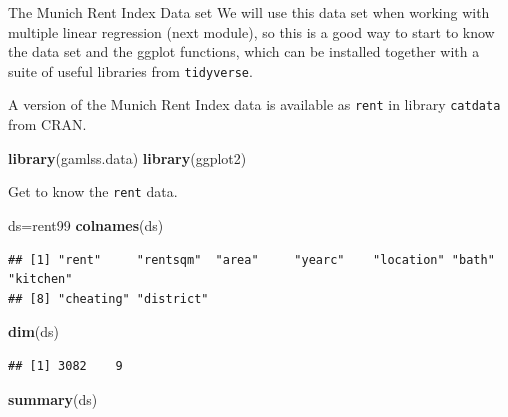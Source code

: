 \documentclass[
  ignorenonframetext,
]{beamer}
\newenvironment{Shaded}{\begin{snugshade}}{\end{snugshade}}
\newcommand{\FunctionTok}[1]{\textcolor[rgb]{0.13,0.29,0.53}{\textbf{#1}}}
\newcommand{\NormalTok}[1]{#1}
\newcommand{\OtherTok}[1]{\textcolor[rgb]{0.56,0.35,0.01}{#1}}
\begin{document}
\begin{frame}[fragile]
\begin{block}{The Munich Rent Index Data set}
\label{the-munich-rent-index-data-set}
We will use this data set when working with multiple linear regression
(next module), so this is a good way to start to know the data set and
the ggplot functions, which can be installed together with a suite of
useful libraries from \texttt{tidyverse}.

A version of the Munich Rent Index data is available as \texttt{rent} in
library \texttt{catdata} from CRAN.

\begin{Shaded}
\begin{Highlighting}[]
\FunctionTok{library}\NormalTok{(gamlss.data)}
\FunctionTok{library}\NormalTok{(ggplot2)}
\end{Highlighting}
\end{Shaded}

Get to know the \texttt{rent} data.

\begin{Shaded}
\begin{Highlighting}[]
\NormalTok{ds}\OtherTok{=}\NormalTok{rent99}
\FunctionTok{colnames}\NormalTok{(ds)}
\end{Highlighting}
\end{Shaded}

\begin{verbatim}
## [1] "rent"     "rentsqm"  "area"     "yearc"    "location" "bath"     "kitchen" 
## [8] "cheating" "district"
\end{verbatim}

\begin{Shaded}
\begin{Highlighting}[]
\FunctionTok{dim}\NormalTok{(ds)}
\end{Highlighting}
\end{Shaded}

\begin{verbatim}
## [1] 3082    9
\end{verbatim}

\begin{Shaded}
\begin{Highlighting}[]
\FunctionTok{summary}\NormalTok{(ds)}
\end{Highlighting}
\end{Shaded}


\end{block}
\end{frame}
\end{document}
